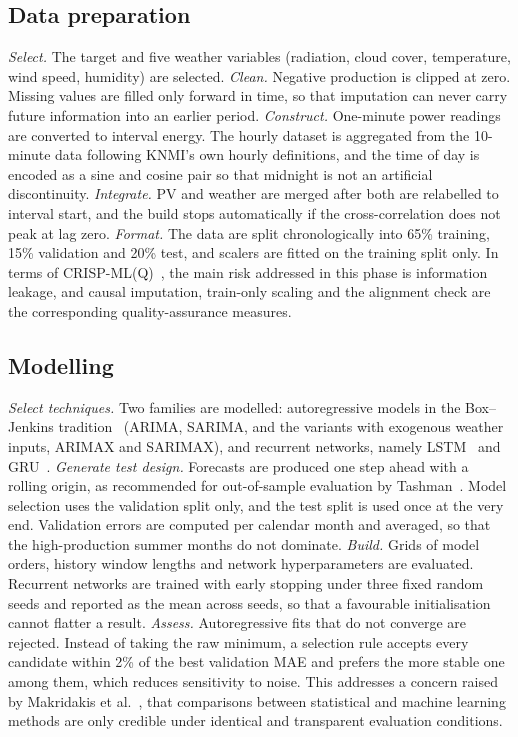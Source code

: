\documentclass[11pt,a4paper]{article}
\begin{document}
\subsection{Data preparation}

\emph{Select.} The target and five weather variables (radiation, cloud cover,
temperature, wind speed, humidity) are selected. \emph{Clean.} Negative
production is clipped at zero. Missing values are filled only forward in time,
so that imputation can never carry future information into an earlier
period. \emph{Construct.} One-minute power readings are converted to interval
energy. The hourly dataset is aggregated from the 10-minute data following KNMI's
own hourly definitions, and the time of day is encoded as a sine and cosine pair
so that midnight is not an artificial discontinuity. \emph{Integrate.} PV and
weather are merged after both are relabelled to interval start, and the build
stops automatically if the cross-correlation does not peak at lag zero.
\emph{Format.} The data are split chronologically into 65\% training, 15\%
validation and 20\% test, and scalers are fitted on the training split only.
In terms of CRISP-ML(Q)~\cite{studer2021}, the main risk addressed in this phase
is information leakage, and causal imputation, train-only scaling and the
alignment check are the corresponding quality-assurance measures.

\subsection{Modelling}

\emph{Select techniques.} Two families are modelled: autoregressive models in
the Box--Jenkins tradition~\cite{box2015} (ARIMA, SARIMA, and the variants with
exogenous weather inputs, ARIMAX and SARIMAX), and recurrent networks, namely
LSTM~\cite{hochreiter1997} and GRU~\cite{cho2014}. \emph{Generate test design.}
Forecasts are produced one step ahead with a rolling origin, as recommended for
out-of-sample evaluation by Tashman~\cite{tashman2000}. Model selection uses the
validation split only, and the test split is used once at the very end.
Validation errors are computed per calendar month and averaged, so that the
high-production summer months do not dominate. \emph{Build.} Grids of model
orders, history window lengths and network hyperparameters are evaluated.
Recurrent networks are trained with early stopping under three fixed random
seeds and reported as the mean across seeds, so that a favourable
initialisation cannot flatter a result. \emph{Assess.} Autoregressive fits that
do not converge are rejected. Instead of taking the raw minimum, a selection
rule accepts every candidate within 2\% of the best validation MAE and prefers
the more stable one among them, which reduces sensitivity to noise. This
addresses a concern raised by Makridakis et al.~\cite{makridakis2018}, that
comparisons between statistical and machine learning methods are only credible
under identical and transparent evaluation conditions.
\end{document}
